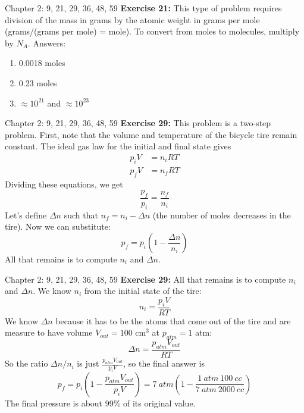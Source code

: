 \documentclass{beamer}
\begin{document}
\begin{frame}{Chapter 2: 9, 21, 29, 36, 48, 59}
\small
\textbf{Exercise 21:} This type of problem requires division of the mass in grams by the atomic weight in grams per mole (grams/(grams per mole) = mole). To convert from moles to molecules, multiply by $N_A$. Answers:
\begin{enumerate}
\item 0.0018 moles
\item 0.23 moles
\item $\approx 10^{21}$ and $\approx 10^{23}$
\end{enumerate}
\end{frame}

\begin{frame}{Chapter 2: 9, 21, 29, 36, 48, 59}
\small
\textbf{Exercise 29:} This problem is a two-step problem.  First, note that the volume and temperature of the bicycle tire remain constant.  The ideal gas law for the initial and final state gives
\begin{align}
p_iV &= n_i R T \\
p_fV &= n_f R T
\end{align}
Dividing these equations, we get
\begin{equation}
\frac{p_f}{p_i} = \frac{n_f}{n_i}
\end{equation}
Let's define $\Delta n$ such that $n_f = n_i -\Delta n$ (the number of moles decreases in the tire).  Now we can substitute:
\begin{equation}
p_f = p_i\left(1-\frac{\Delta n}{n_i}\right)
\end{equation}
All that remains is to compute $n_i$ and $\Delta n$.
\end{frame}

\begin{frame}{Chapter 2: 9, 21, 29, 36, 48, 59}
\small
\textbf{Exercise 29:} All that remains is to compute $n_i$ and $\Delta n$. We know $n_i$ from the initial state of the tire:
\begin{equation}
n_i = \frac{p_iV}{RT}
\end{equation}
We know $\Delta n$ because it has to be the atoms that come out of the tire and are measure to have volume $V_{out}=100$ cm$^3$ at $p_{atm} = 1$ atm:
\begin{equation}
\Delta n = \frac{p_{atm}V_{out}}{RT}
\end{equation}
So the ratio $\Delta n/n_i$ is just $\frac{p_{atm}V_{out}}{p_iV}$, so the final answer is
\begin{equation}
p_f = p_i\left(1-\frac{p_{atm}V_{out}}{p_iV}\right) = 7~atm \left(1-\frac{1~atm~100~cc}{7~atm~2000~cc}\right)
\end{equation}
The final pressure is about 99\% of its original value.
\end{frame}
\end{document}
